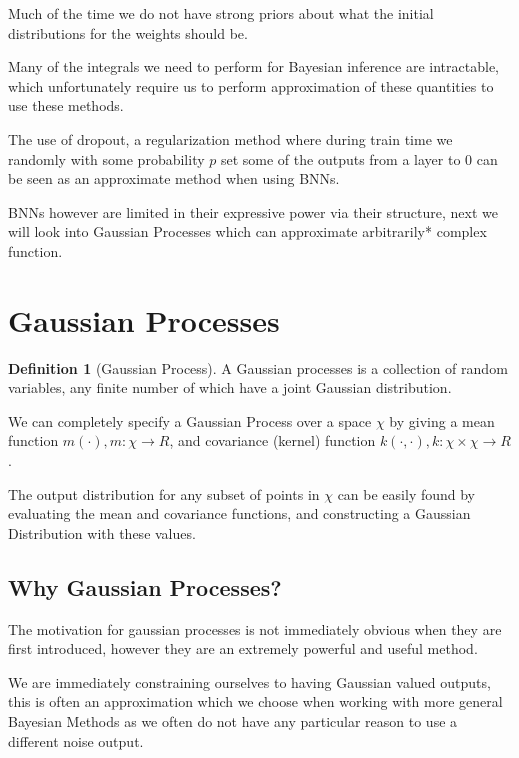 \documentclass[12pt, a4paper]{report}
\theoremstyle{definition}
\theoremstyle{definition}
\newtheorem{definition}{Definition}[section]
\theoremstyle{definition}
\begin{document}
Much of the time we do not have strong priors about what the initial distributions for the weights should be.

Many of the integrals we need to perform for Bayesian inference are intractable, which unfortunately require us to perform approximation of these quantities to use these methods.

The use of dropout, a regularization method where during train time we randomly with some probability $p$ set some of the outputs from a layer to 0 can be seen as an approximate method when using BNNs.

BNNs however are limited in their expressive power via their structure, next we will look into Gaussian Processes which can approximate arbitrarily* complex function.

\section{Gaussian Processes}
\label{sec:GaussianProcesses}


\begin{definition}[Gaussian Process]
    A Gaussian processes is a collection of random variables, any finite number of which have a joint Gaussian distribution. \cite[]{rasmussen2003gaussian}
\end{definition}


We can completely specify a Gaussian Process over a space $\chi$ by giving a mean function $m(\cdot), m : \chi \rightarrow R$, and covariance (kernel) function $k(\cdot, \cdot), k: \chi \times \chi \rightarrow R$.


The output distribution for any subset of points in $\chi$ can be easily found by evaluating the mean and covariance functions, and constructing a Gaussian Distribution with these values.


\subsection{Why Gaussian Processes?}

The motivation for gaussian processes is not immediately obvious when they are first introduced, however they are an extremely powerful and useful method.

We are immediately constraining ourselves to having Gaussian valued outputs, this is often an approximation which we choose when working with more general Bayesian Methods as we often do not have any particular reason to use a different noise output.
\end{document}
